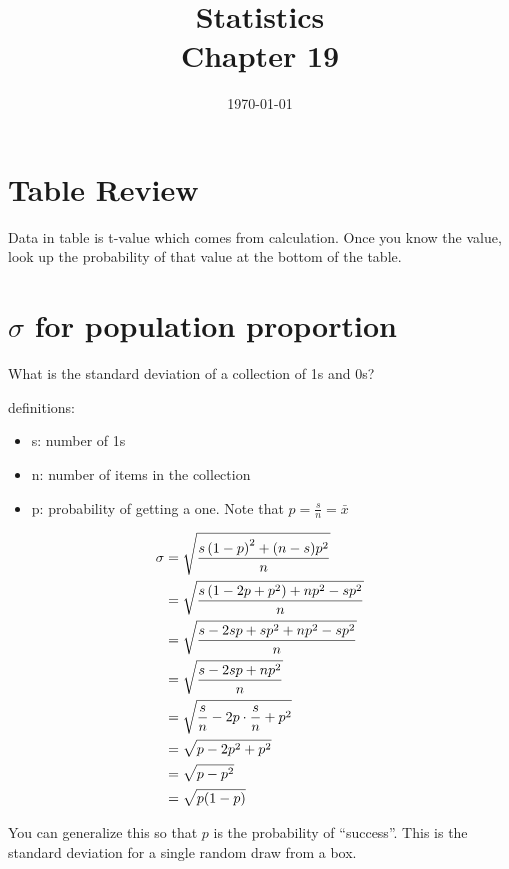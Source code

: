 \documentclass[letterpaper, landscape]{exam}
\title{Statistics \\ Chapter 19}
\date{\today}
\author{}
\begin{document}
  \maketitle
  \setcounter{tocdepth}{2}
  \tableofcontents

  \section{Table Review} %

  Data in table is t-value which comes from calculation. Once you know the value, look
  up the probability of that value at the bottom of the table.

  
  \section{$\sigma$ for population proportion} %

  What is the standard deviation of a collection of 1s and 0s?

  definitions:
  \begin{itemize}[nosep, label={}]
    \item s: number of 1s
    \item n: number of items in the collection
    \item p: probability of getting a one. Note that $p =
      \frac{s}{n} = \bar{x}$
  \end{itemize}

  \begin{align*}
    \sigma & = \sqrt{ \frac{s \del{1 - p}^2 + (n - s)p^2}{n} } \\
           & = \sqrt{ \frac{s \del{ 1 - 2p + p^2} + np^2 - sp^2}{n} } \\
           & = \sqrt{ \frac{s - 2 s p + s p^2 + np^2 - sp^2}{n} } \\
           & = \sqrt{ \frac{s - 2 s p + np^2 }{n} } \\
           & = \sqrt{ \frac{s}{n} - 2 p \cdot \frac{s}{n}  + p^2 } \\
           & = \sqrt{ p - 2 p^2 + p^2 } \\
           & = \sqrt{ p - p^2 } \\
           & = \sqrt{ p (1 - p) } \\
  \end{align*}

  You can generalize this so that $p$ is the probability of ``success''. This is
  the standard deviation for a single random draw from a box.
  
\end{document}
